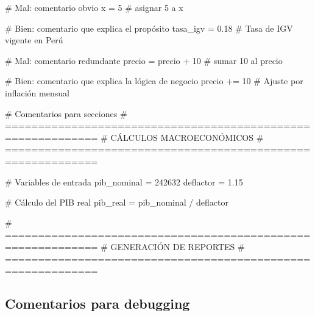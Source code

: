 \documentclass[
  doc,
  floatsintext,
  longtable,
  a4paper,
  nolmodern,
  notxfonts,
  notimes,
  12pt,
  colorlinks=true,linkcolor=blue,citecolor=blue,urlcolor=blue]{apa7}
\newenvironment{Shaded}{\begin{snugshade}}{\end{snugshade}}
\newcommand{\CommentTok}[1]{\textcolor[rgb]{0.37,0.37,0.37}{#1}}
\newcommand{\DecValTok}[1]{\textcolor[rgb]{0.68,0.00,0.00}{#1}}
\newcommand{\FloatTok}[1]{\textcolor[rgb]{0.68,0.00,0.00}{#1}}
\newcommand{\NormalTok}[1]{\textcolor[rgb]{0.00,0.23,0.31}{#1}}
\newcommand{\OperatorTok}[1]{\textcolor[rgb]{0.37,0.37,0.37}{#1}}
\begin{document}
\begin{Shaded}
\begin{Highlighting}[]
\CommentTok{\# Mal: comentario obvio}
\NormalTok{x }\OperatorTok{=} \DecValTok{5}  \CommentTok{\# asignar 5 a x}

\CommentTok{\# Bien: comentario que explica el propósito}
\NormalTok{tasa\_igv }\OperatorTok{=} \FloatTok{0.18}  \CommentTok{\# Tasa de IGV vigente en Perú}

\CommentTok{\# Mal: comentario redundante}
\NormalTok{precio }\OperatorTok{=}\NormalTok{ precio }\OperatorTok{+} \DecValTok{10}  \CommentTok{\# sumar 10 al precio}

\CommentTok{\# Bien: comentario que explica la lógica de negocio}
\NormalTok{precio }\OperatorTok{+=} \DecValTok{10}  \CommentTok{\# Ajuste por inflación mensual}

\CommentTok{\# Comentarios para secciones}
\CommentTok{\# ============================================================}
\CommentTok{\# CÁLCULOS MACROECONÓMICOS}
\CommentTok{\# ============================================================}

\CommentTok{\# Variables de entrada}
\NormalTok{pib\_nominal }\OperatorTok{=} \DecValTok{242632}
\NormalTok{deflactor }\OperatorTok{=} \FloatTok{1.15}

\CommentTok{\# Cálculo del PIB real}
\NormalTok{pib\_real }\OperatorTok{=}\NormalTok{ pib\_nominal }\OperatorTok{/}\NormalTok{ deflactor}

\CommentTok{\# ============================================================}
\CommentTok{\# GENERACIÓN DE REPORTES}
\CommentTok{\# ============================================================}
\end{Highlighting}
\end{Shaded}

\subsection{Comentarios para
debugging}\label{comentarios-para-debugging}
\end{document}

